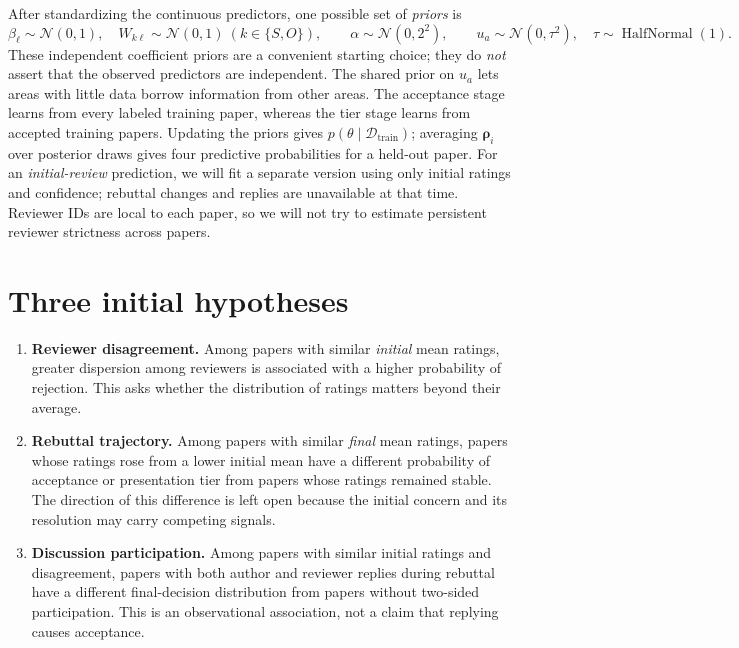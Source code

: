 \documentclass[11pt]{article}
\begin{document}
After standardizing the continuous predictors, one possible set of \emph{priors} is
\begin{equation*}
 \beta_\ell\sim\mathcal{N}(0,1),\quad
 W_{k\ell}\sim\mathcal{N}(0,1)\ (k\in\{S,O\}),\qquad
 \alpha\sim\mathcal{N}(0,2^2),\qquad
 u_a\sim\mathcal{N}(0,\tau^2),\quad
 \tau\sim\operatorname{HalfNormal}(1).
\end{equation*}
These independent coefficient priors are a convenient starting choice; they do \emph{not} assert that the observed predictors are independent. The shared prior on $u_a$ lets areas with little data borrow information from other areas. The acceptance stage learns from every labeled training paper, whereas the tier stage learns from accepted training papers. Updating the priors gives $p(\theta\mid\mathcal D_{\mathrm{train}})$; averaging $\boldsymbol\rho_i$ over posterior draws gives four predictive probabilities for a held-out paper. For an \emph{initial-review} prediction, we will fit a separate version using only initial ratings and confidence; rebuttal changes and replies are unavailable at that time. Reviewer IDs are local to each paper, so we will not try to estimate persistent reviewer strictness across papers.

\section*{Three initial hypotheses}
\begin{enumerate}[label=\textbf{H\arabic*.}]
 \item \textbf{Reviewer disagreement.} Among papers with similar \emph{initial} mean ratings, greater dispersion among reviewers is associated with a higher probability of rejection. This asks whether the distribution of ratings matters beyond their average.
 \item \textbf{Rebuttal trajectory.} Among papers with similar \emph{final} mean ratings, papers whose ratings rose from a lower initial mean have a different probability of acceptance or presentation tier from papers whose ratings remained stable. The direction of this difference is left open because the initial concern and its resolution may carry competing signals.
 \item \textbf{Discussion participation.} Among papers with similar initial ratings and disagreement, papers with both author and reviewer replies during rebuttal have a different final-decision distribution from papers without two-sided participation. This is an observational association, not a claim that replying causes acceptance.
\end{enumerate}
\end{document}
